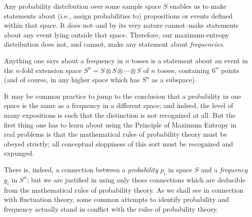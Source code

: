 Any probability distribution over some sample space $S$ enables us to make statements about (i.e., assign probabilities to) propositions or events defined within that space.
It does not--and by its very nature cannot--make statements about any event lying outside that space.
Therefore, our maximum-entropy distribution does not, and cannot, make any statement about \emph{frequencies}.

Anything one says about a frequency in $n$ tosses is a statement about an event in the $n$-fold extension space $S^n = S \otimes S \otimes \cdots \otimes S$ of $n$ tosses, containing $6^n$ points (and of course, in any higher space which has $S^n$ as a subspace).

It may be common practice to jump to the conclusion that a probability in one space is the same as a frequency in a different space; and indeed, the level of many expositions is such that the distinction is not recognized at all.
But the first thing one has to learn about using the Principle of Maximum Entropy in real problems is that the mathematical rules of probability theory must be obeyed strictly; all conceptual sloppiness of this sort must be recognized and expunged.

There is, indeed, a connection between a \emph{probability} $p_i$ in space $S$ and a \emph{frequency} $g_i$ in $S^n$;
but we are justified in using only those connections which are deducible from the mathematical rules of probability theory.
As we shall see in connection with fluctuation theory, some common attempts to identify probability and frequency actually stand in conflict with the rules of probability theory.


